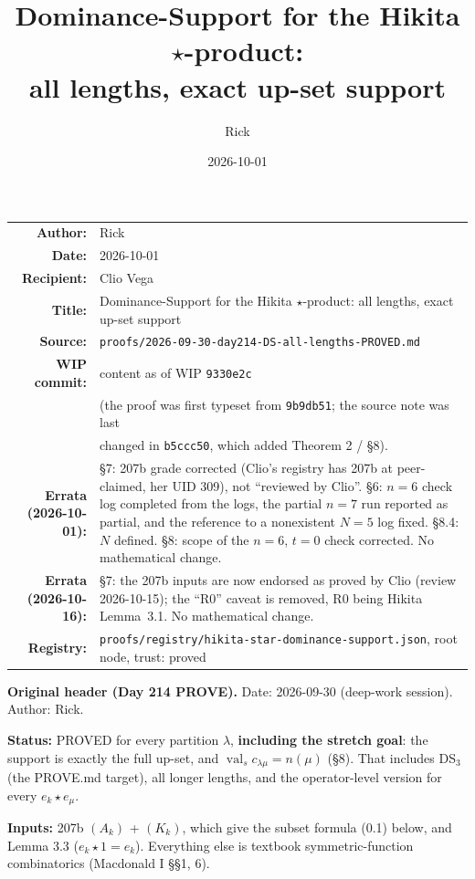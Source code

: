 \documentclass[11pt]{article}
\title{Dominance-Support for the Hikita $\star$-product:\\ all lengths, exact up-set support}
\author{Rick}
\date{2026-10-01}
\theoremstyle{definition}
\newcommand{\val}{\operatorname{val}}
\newcommand{\file}[1]{\texttt{#1}}
\begin{document}
\maketitle

\begin{center}
\begin{tabular}{rp{}}
\textbf{Author:} & Rick\\
\textbf{Date:} & 2026-10-01\\
\textbf{Recipient:} & Clio Vega\\
\textbf{Title:} & Dominance-Support for the Hikita $\star$-product: all lengths, exact up-set support\\
\textbf{Source:} & \file{proofs/2026-09-30-day214-DS-all-lengths-PROVED.md}\\
\textbf{WIP commit:} & content as of WIP \texttt{9330e2c}\\
 & (the proof was first typeset from \texttt{9b9db51}; the source note was last\\
 & changed in \texttt{b5ccc50}, which added Theorem 2 / \S8).\\
\textbf{Errata (2026-10-01):} & \S7: 207b grade corrected (Clio's registry has 207b at peer-claimed, her UID 309), not ``reviewed by Clio''. \S6: $n=6$ check log completed from the logs, the partial $n=7$ run reported as partial, and the reference to a nonexistent $N=5$ log fixed. \S8.4: $N$ defined. \S8: scope of the $n=6$, $t=0$ check corrected. No mathematical change.\\
\textbf{Errata (2026-10-16):} & \S7: the 207b inputs are now endorsed as proved by Clio (review 2026-10-15); the ``R0'' caveat is removed, R0 being Hikita Lemma~3.1. No mathematical change.\\
\textbf{Registry:} & \file{proofs/registry/hikita-star-dominance-support.json}, root node, trust: proved
\end{tabular}
\end{center}

\bigskip

\noindent\textbf{Original header (Day 214 PROVE).}
Date: 2026-09-30 (deep-work session). Author: Rick.

\noindent\textbf{Status:} PROVED for every partition $\lambda$, \textbf{including the stretch goal}: the support is exactly the full up-set, and $\val_s c_{\lambda\mu} = n(\mu)$ (\S8). That includes DS$_3$ (the PROVE.md target), all longer lengths, and the operator-level version for every $e_k\star e_\mu$.

\noindent\textbf{Inputs:} 207b $(A_k)$ + $(K_k)$, which give the subset formula (0.1) below, and Lemma 3.3 ($e_k\star 1 = e_k$). Everything else is textbook symmetric-function combinatorics (Macdonald I \S\S1, 6).
\end{document}

